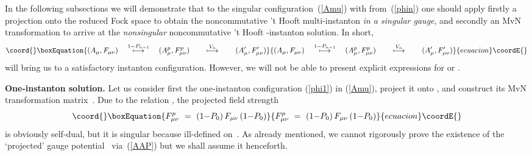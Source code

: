 \documentclass[a4paper,11pt]{article}
\numberwithin{equation}{section}
\providecommand{\C}{\mathbb C}
\providecommand{\Hcal}{{\cal H}}
\def\>{\rangle}
\begin{document}
{In the following subsections we will demonstrate that 
to the singular configuration~(\ref{Amu}) with \myHighlight{$\phi$}\coordHE{} from~(\ref{phin}) 
one should apply firstly a projection onto the reduced Fock space
\myHighlight{$(1{-}P_{n-1})\Hcal\otimes\C^2$}\coordHE{} to obtain the noncommutative 't Hooft
multi-instanton {\it in a singular gauge\/}, 
and secondly an MvN transformation to arrive at the {\it nonsingular\/} 
noncommutative 't Hooft \coordHE{}-instanton solution. In short,
\begin{equation}\coord{}\boxEquation{
(A_\mu,F_{\mu\nu})\quad\buildrel{1-P_{n-1}}\over\longmapsto\quad 
(A^p_\mu,F^p_{\mu\nu})\qquad\buildrel{V_n}\over\longmapsto\qquad 
(A'_\mu,F'_{\mu\nu})
}{
(A_\mu,F_{\mu\nu})\quad\buildrel{1-P_{n-1}}\over\longmapsto\quad 
(A^p_\mu,F^p_{\mu\nu})\qquad\buildrel{V_n}\over\longmapsto\qquad 
(A'_\mu,F'_{\mu\nu})
}{ecuacion}\coordE{}\end{equation}
will bring us to a satisfactory instanton configuration.
However, we will not be able to present explicit expressions for
\coordHE{} or \coordHE{}.


\noindent
{\bf One-instanton solution.}
Let us consider first the one-instanton
configuration (\ref{phi1}) in (\ref{Amu}), project it onto 
\myHighlight{$(1{-}P_0)\Hcal\otimes\C^2$}\coordHE{}, and construct its
MvN transformation matrix~\coordHE{}.
Due to the relation \coordHE{}, the projected field strength
\begin{equation}\coord{}\boxEquation{
F^p_{\mu\nu}\ =\ (1{-}P_0)\,F_{\mu\nu}\,(1{-}P_0)
}{
F^p_{\mu\nu}\ =\ (1{-}P_0)\,F_{\mu\nu}\,(1{-}P_0)
}{ecuacion}\coordE{}\end{equation}
is obviously self-dual, but it is singular because ill-defined 
on~\myHighlight{$|0,0\>\otimes\C^2$}\coordHE{}.  As already mentioned, 
we cannot rigorously prove the existence of the `projected' 
gauge potential~\coordHE{} via~(\ref{AAP}) but we shall assume it henceforth.

}
\end{document}
